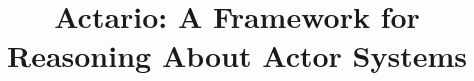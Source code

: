 \documentclass{sig-alternate}
\begin{document}
%

\title{Actario: A Framework for Reasoning About Actor Systems}
%
%
%
%
%
\end{document}
